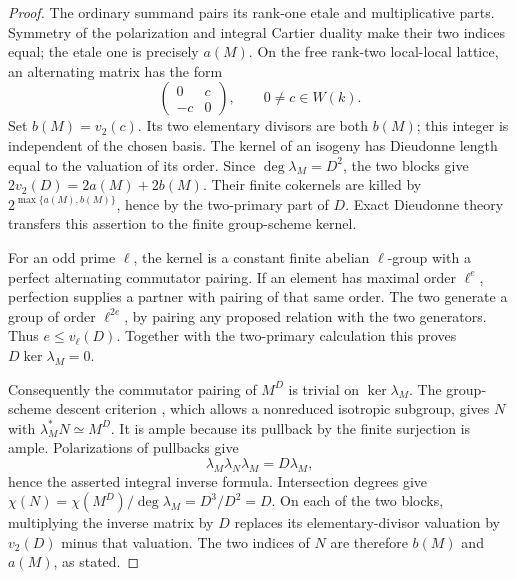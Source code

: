 \begin{proof}
The ordinary summand pairs its rank-one etale and multiplicative
parts.  Symmetry of the polarization and integral Cartier duality
make their two indices equal; the etale one is precisely $a(M)$.
On the free rank-two local-local lattice, an alternating matrix has
the form
\[
                         \begin{pmatrix}0&c\\-c&0\end{pmatrix},
                         \qquad 0\ne c\in W(k).
\]
Set $b(M)=v_2(c)$.  Its two elementary divisors are both $b(M)$;
this integer is independent of the chosen basis.
The kernel of an isogeny has Dieudonne length equal to the valuation
of its order.  Since $\deg\lambda_M=D^2$, the two blocks give
$2v_2(D)=2a(M)+2b(M)$.  Their finite cokernels are killed by
$2^{\max\{a(M),b(M)\}}$, hence by the two-primary part of $D$.
Exact Dieudonne theory transfers this assertion to the finite
group-scheme kernel.

For an odd prime $\ell$, the kernel is a constant finite abelian
$\ell$-group with a perfect alternating commutator pairing.
If an element has maximal order $\ell^e$, perfection supplies a
partner with pairing of that same order.  The two generate a group
of order $\ell^{2e}$, by pairing any proposed relation with the two
generators.  Thus $e\le v_\ell(D)$.
Together with the two-primary calculation this proves
$D\ker\lambda_M=0$.

Consequently the commutator pairing of $M^D$ is trivial on
$\ker\lambda_M$.  The group-scheme descent criterion
\cite[Corollary~8.11 and its proof, p.~117]
{EdixhovenVanDerGeerMoonenAV}, which allows a nonreduced isotropic
subgroup, gives $N$ with $\lambda_M^*N\simeq M^D$.
It is ample because its pullback by the finite surjection is ample.
Polarizations of pullbacks give
\[
                   \lambda_M\lambda_N\lambda_M=D\lambda_M,
\]
hence the asserted integral inverse formula.
Intersection degrees give
$\chi(N)=\chi(M^D)/\deg\lambda_M=D^3/D^2=D$.
On each of the two blocks, multiplying the inverse matrix by $D$
replaces its elementary-divisor valuation by $v_2(D)$ minus that
valuation.  The two indices of $N$ are therefore $b(M)$ and $a(M)$,
as stated.
\end{proof}

